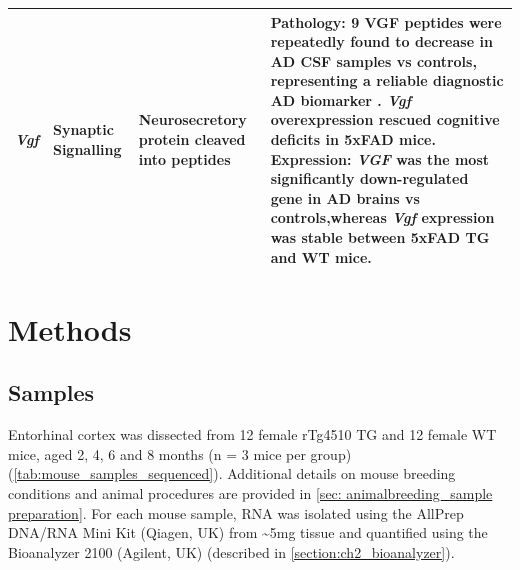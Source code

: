 \begin{landscape}
\begin{longtable}[c]{p{1cm}p{2cm}p{4cm}p{19cm}}
			\centering \textit{Vgf} &
			\centering Synaptic Signalling  &
			\centering Neurosecretory protein cleaved into peptides \newline &
			\tabitem \textbf{Pathology}: 9 VGF peptides were repeatedly found to decrease in AD CSF samples vs controls, representing a reliable diagnostic AD biomarker \cite{VanSteenoven2019}. \newline
			\tabitem \textit{Vgf} overexpression rescued cognitive deficits in 5xFAD mice\cite{Bai2020}. \newline
			\tabitem \textbf{Expression}: \textit{VGF} was the most significantly down-regulated gene in AD brains vs controls\cite{Beckmann2020},whereas \textit{Vgf} expression was stable between 5xFAD TG and WT mice\cite{Bai2020}. \\* \bottomrule
		\end{longtable}
	\end{landscape}
\restoregeometry

 

\section{Methods}

\subsection{Samples}
Entorhinal cortex was dissected from 12 female rTg4510 TG and 12 female WT mice, aged 2, 4, 6 and 8 months (n = 3 mice per group) (\cref{tab:mouse_samples_sequenced}). Additional details on mouse breeding conditions and animal procedures are provided in \cref{sec: animalbreeding_sample preparation}. For each mouse sample, RNA was isolated using the AllPrep DNA/RNA Mini Kit (Qiagen, UK) from \textasciitilde5mg tissue and quantified using the Bioanalyzer 2100 (Agilent, UK) (described in \cref{section:ch2_bioanalyzer}). 
 
